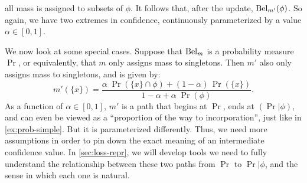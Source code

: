 \begin{example}
all mass is assigned to subsets of $\phi$.
It follows that, after the update, $\mathrm{Bel}_{m'}(\phi)$.
So again, we have two extremes in confidence, continuously parameterized
by a value $\alpha \in [0,1]$.

We now look at some special cases. Suppose that $\mathrm{Bel}_m$ is a probability 
measure $\Pr$, or equivalently, that $m$ only assigns mass to singletons.
Then $m'$ also only assigns mass to singletons, and is given by:
\begin{equation}
m'(\{x\}) =
 \frac{\alpha\; \Pr(\{x\} \cap \phi) + (1-\alpha)\, \Pr(\{x\})}{1 - \alpha + \alpha\; \Pr(\phi)}.
\end{equation}
As a function of $\alpha \in [0,1]$, $m'$ is  
a path that begins at $\Pr$,  ends at $(\Pr |\phi)$,
and can even be viewed as a ``proportion of the way to incorporation'',
just like in \cref{ex:prob-simple}.
But it is parameterized differently.
Thus, we need more assumptions in order to pin down the
exact meaning of an intermediate confidence value.
In \cref{sec:loss-repr}, we will
develop tools we need to fully understand the relationship between
these two paths from $\Pr$ to $\Pr|\phi$, and the sense in which
each one is natural.



\end{example}
